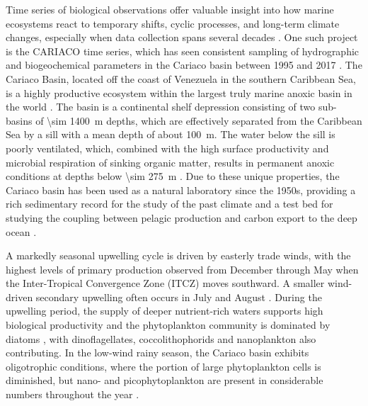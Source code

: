 \documentclass[draft]{agujournal2019}
\begin{document}
   
    Time series of biological observations offer valuable insight into how marine ecosystems react to temporary shifts, cyclic processes, and long-term climate changes, especially when data collection spans several decades \cite{carstensen_need_2014, henson_observing_2016}. 
    One such project is the CARIACO time series, which has seen consistent sampling of hydrographic and biogeochemical parameters in the Cariaco basin between 1995 and 2017 \cite{muller-karger_scientific_2019}. 
    The Cariaco Basin, located off the coast of Venezuela in the southern Caribbean Sea, is a highly productive ecosystem within the largest truly marine anoxic basin in the world \cite{edgcomb_accessing_2011}. The basin is a continental shelf depression consisting of two sub-basins of \qty{\sim 1400}{m} depths, which are effectively separated from the Caribbean Sea by a sill with a mean depth of about \qty{100}{m}. The water below the sill is poorly ventilated, which, combined with the high surface productivity and microbial respiration of sinking organic matter, results in permanent anoxic conditions at depths below \qty{\sim 275}{m} \cite{thunell_organic_2000}. Due to these unique properties, the Cariaco basin has been used as a natural laboratory since the 1950s, providing a rich sedimentary record for the study of the past climate \cite{hughen1996nature} and a test bed for studying the coupling between pelagic production and carbon export to the deep ocean \cite{montes_vertical_2012}.

    A markedly seasonal upwelling cycle is driven by easterly trade winds, with the highest levels of primary production observed from December through May when the Inter-Tropical Convergence Zone (ITCZ) moves southward. A smaller wind-driven secondary upwelling often occurs in July and August \cite{mullerkarger_annual_2001, astor_seasonal_2003}. During the upwelling period, the supply of deeper nutrient-rich waters supports high biological productivity and the phytoplankton community is dominated by diatoms \cite{romero_seasonal_2009}, with dinoflagellates, coccolithophorids and nanoplankton also contributing. In the low-wind rainy season, the Cariaco basin exhibits oligotrophic conditions, where the portion of large phytoplankton cells is diminished, but nano- and picophytoplankton are present in considerable numbers throughout the year \cite{lorenzoni_characterization_2015}.    
\end{document}

